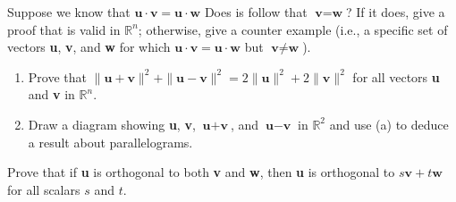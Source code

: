 \documentclass[11pt,letterpaper,boxed]{hmcpset}
\begin{document}


\pagebreak


\begin{problem}[\#60]
Suppose we know that $\textbf{u} \cdot \textbf{v}= \textbf{u} \cdot \textbf{w}$ Does is follow that $\textbf{v}= \textbf{w}$? If it does, give a proof that is valid in $\mathbb{R}^n$; otherwise, give a counter example (i.e., a specific set of vectors \textbf{u}, \textbf{v}, and \textbf{w} for which $\textbf{u} \cdot \textbf{v}= \textbf{u} \cdot \textbf{w}$ but $\textbf{v} \neq \textbf{w}$).
\end{problem}



\pagebreak


\begin{problem}[\#62] 
\begin{enumerate}
\item Prove that $ \| \textbf{u} + \textbf{v}\|^2 + \| \textbf{u} - \textbf{v}\|^2 = 2\| \textbf{u}\|^2 + 2\| \textbf{v}\|^2 $ for all vectors \textbf{u} and \textbf{v} in $\mathbb{R}^n$.
\item Draw a diagram showing \textbf{u}, \textbf{v}, $\textbf{u} + \textbf{v}$, and $\textbf{u} - \textbf{v}$ in $\mathbb{R}^2$ and use (a) to deduce a result about parallelograms.
\end{enumerate}
\end{problem}



\pagebreak


\begin{problem}[\#68b] 
Prove that if \textbf{u} is orthogonal to both \textbf{v} and \textbf{w}, then \textbf{u} is orthogonal to $s\textbf{v} + t\textbf{w}$ for all scalars $s$ and $t$.
\end{problem}
\end{document}

